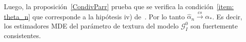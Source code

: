 Luego, la proposición~\ref{CondivParr} prueba que se verifica la condición~\ref{item: theta_n} que corresponde a la hipótesis iv) de~\cite{parr1982}. Por lo tanto $\widehat{\alpha}_n \stackrel{cs}{\longrightarrow} \alpha_*$. Es decir, los estimadores MDE del parámetro de textura del modelo $\mathcal{G}_I^0$ son fuertemente consistentes.
%
%
%
